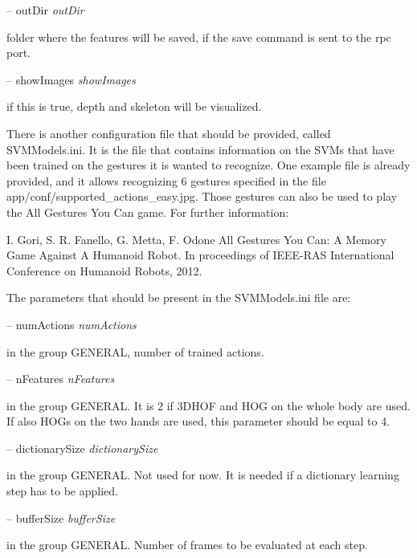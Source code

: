 -- out\+Dir {\itshape out\+Dir} 
\begin{DoxyItemize}
\item folder where the features will be saved, if the save command is sent to the rpc port.
\end{DoxyItemize}

-- show\+Images {\itshape show\+Images} 
\begin{DoxyItemize}
\item if this is true, depth and skeleton will be visualized.
\end{DoxyItemize}

There is another configuration file that should be provided, called S\+V\+M\+Models.\+ini. It is the file that contains information on the S\+V\+Ms that have been trained on the gestures it is wanted to recognize. One example file is already provided, and it allows recognizing 6 gestures specified in the file app/conf/supported\+\_\+actions\+\_\+easy.\+jpg. Those gestures can also be used to play the All Gestures You Can game. For further information\+:

I. Gori, S. R. Fanello, G. Metta, F. Odone All Gestures You Can\+: A Memory Game Against A Humanoid Robot. In proceedings of I\+E\+E\+E-\/\+R\+AS International Conference on Humanoid Robots, 2012.

The parameters that should be present in the S\+V\+M\+Models.\+ini file are\+:

-- num\+Actions {\itshape num\+Actions} 
\begin{DoxyItemize}
\item in the group G\+E\+N\+E\+R\+AL, number of trained actions.
\end{DoxyItemize}

-- n\+Features {\itshape n\+Features} 
\begin{DoxyItemize}
\item in the group G\+E\+N\+E\+R\+AL. It is 2 if 3\+D\+H\+OF and H\+OG on the whole body are used. If also H\+O\+Gs on the two hands are used, this parameter should be equal to 4.
\end{DoxyItemize}

-- dictionary\+Size {\itshape dictionary\+Size} 
\begin{DoxyItemize}
\item in the group G\+E\+N\+E\+R\+AL. Not used for now. It is needed if a dictionary learning step has to be applied.
\end{DoxyItemize}

-- buffer\+Size {\itshape buffer\+Size} 
\begin{DoxyItemize}
\item in the group G\+E\+N\+E\+R\+AL. Number of frames to be evaluated at each step.
\end{DoxyItemize}

